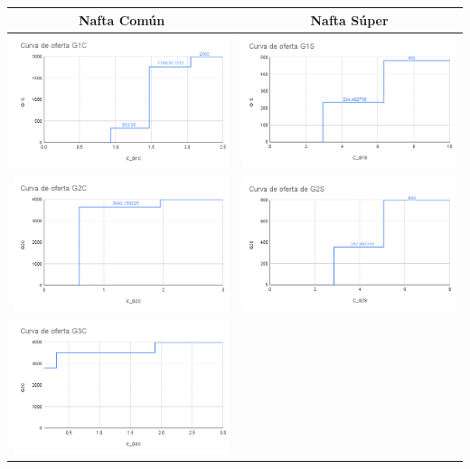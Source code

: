 \documentclass[
]{article}
\begin{document}
\begin{longtable}[]{@{}cc@{}}
\toprule
Nafta Común & Nafta Súper \\
\midrule
\endhead
\includegraphics[width=3.125in,height=\textheight]{img/G1C.png} &
\includegraphics[width=3.125in,height=\textheight]{img/G1S.png} \\
\includegraphics[width=3.125in,height=\textheight]{img/G2C.png} &
\includegraphics[width=3.125in,height=\textheight]{img/G2S.png} \\
\includegraphics[width=3.125in,height=\textheight]{img/G3C.png} &

\end{longtable}
\end{document}
